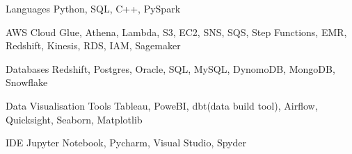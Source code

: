 

\begin{cvskillsnoncentered}

  \cvskill
{Languages}
{Python, SQL, C++, PySpark}

\cvskill
{AWS Cloud}
{Glue, Athena, Lambda, S3, EC2, SNS, SQS, Step Functions, 
EMR, Redshift, Kinesis, RDS, IAM, Sagemaker}

\cvskill
{Databases}
{Redshift, Postgres, Oracle, SQL, MySQL, DynomoDB, MongoDB, Snowflake }

\cvskill
{Data Visualisation Tools}
{Tableau, PoweBI, dbt(data build tool), Airflow, Quicksight, Seaborn, Matplotlib}

\cvskill
{IDE}
{Jupyter Notebook, Pycharm, Visual Studio, Spyder}


\end{cvskillsnoncentered}
